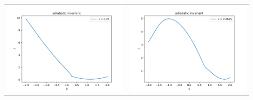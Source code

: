 \documentclass[a4paper,zihao=5,UTF8]{ctexart}
\begin{document}
     \begin{table}[htbp]
        \centering
        \begin{tabular}[htbp]{cc}
            \includegraphics[scale=0.5]{3_ad_invr_v=0_25.png} & \includegraphics[scale=0.5]{3_ad_invr_v=0_0625.png} \\

\end{tabular}
\end{table}
\end{document}
